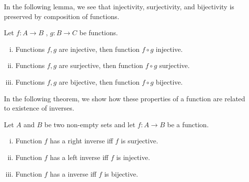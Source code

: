 \documentclass[a4paper,english,12pt]{article}   	%
\begin{document}
In the following lemma, we see that injectivity, surjectivity, and bijectivity is preserved by composition of functions.
\begin{lem}
Let $f \colon A \to B$ , $g \colon B \to C$ be functions.
\begin{enumerate}[i)]
\item  Functions $f, g$ are injective, then function $f \circ g$ injective.
\item  Functions $f, g$ are surjective, then  function $f \circ g$ surjective.
\item  Functions $f, g$ are bijective, then function $f \circ g$ bijective.
\end{enumerate}
\end{lem}

In the following theorem, we show how these properties of a function are related to existence of inverses.
\begin{thm}\label{Thm:BijectiveInverse}
Let $A$ and $B$ be two non-empty sets and let $f \colon A \to B$ be a function. 
\begin{enumerate}[i)]
\item Function $f$ has a right inverse iff $f$ is surjective.
\item Function $f$ has a left inverse iff $f$ is injective.
\item Function $f$ has a inverse iff $f$ is bijective.
\end{enumerate}
\end{thm}
\end{document}
